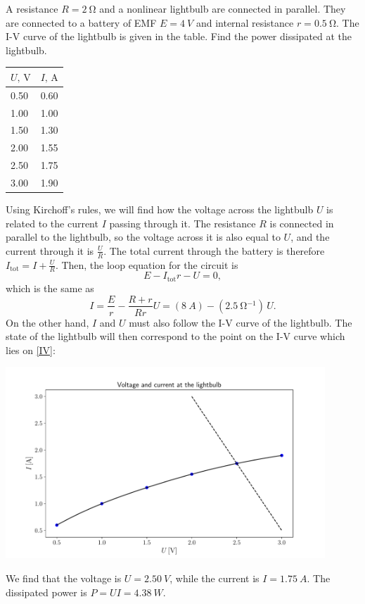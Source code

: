 \documentclass[../TST.tex]{subfiles}
\begin{document}
\begin{pproblem}
A resistance $R=\qty{2}{\ohm}$ and a nonlinear lightbulb are connected in parallel. They are connected to a battery of EMF $E=\qty{4}{V}$ and internal resistance $r=\qty{0.5}{\ohm}$. The I-V curve of the lightbulb is given in the table. Find the power dissipated at the lightbulb.

\begin{center}
\begin{tabular}{@{}ll@{}}
\toprule
$U,\,\mathrm{V}$     & $I,\,\mathrm{A}$     \\ \midrule
0.50 & 0.60 \\
1.00 & 1.00 \\
1.50 & 1.30 \\
2.00 & 1.55 \\
2.50 & 1.75 \\
3.00 & 1.90 \\ \bottomrule
\end{tabular}
  \end{center}
\end{pproblem}
\ifprob \else
	\begin{solution} Using Kirchoff's rules, we will find how the voltage across the lightbulb $U$ is related to the current $I$ passing through it. The resistance $R$ is connected in parallel to the lightbulb, so the voltage across it is also equal to $U$, and the current through it is $\frac{U}{R}$. The total current through the battery is therefore $I_\mathrm{tot}=I+\frac{U}{R}$. Then, the loop equation for the circuit is
		\begin{equation*}
	E-I_\mathrm{tot}r-U=0	
		,
		\end{equation*}
which is the same as
\begin{equation}
	I=\frac{E}{r}-\frac{R+r}{Rr}U= (\qty{8}{A})-(\qty{2.5}{\ohm^{-1}})\,U
.\label{IV}
\end{equation}
On the other hand, $I$ and $U$ must also follow the I-V curve of the lightbulb. The state of the lightbulb will then correspond to the point on the I-V curve which lies on \eqref{IV}:
\begin{center}
\includegraphics[width=0.9\textwidth]{fig/a2017_s4.pdf}
\end{center}
We find that the voltage is $U=\qty{2.50}{V}$, while the current is $I=\qty{1.75}{A}$. The dissipated power is $P=UI=\boxed{\qty{4.38}{W}}$.
\end{solution}
\fi
\end{document}
